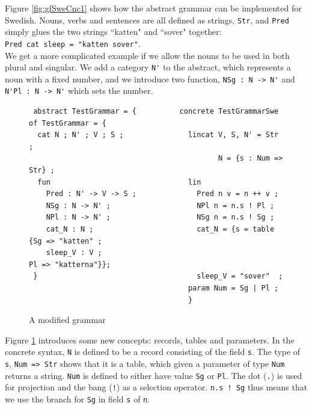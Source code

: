\documentclass{report}
\begin{document}
Figure \ref{fig:gfSweCnc1} shows how the abstract grammar can be implemented
for Swedish. Nouns, verbs and sentences are all defined as strings, \verb|Str|,
and \verb|Pred| simply glues the two strings ``katten" and ``sover" together:\\
\verb|Pred cat sleep = "katten sover"|.\\
We get a more complicated example if we allow the nouns to be used in both
plural and singular. We add a category \verb|N'| to the
abstract, which represents a noun with a fixed number,
and we introduce two function, \verb|NSg : N -> N'| and
\verb|N'Pl : N -> N'| which sets the number.
\begin{figure}[h!]
\begin{verbatim}              
 abstract TestGrammar = {          concrete TestGrammarSwe of TestGrammar = {
  cat N ; N' ; V ; S ;               lincat V, S, N' = Str ;
                                            N = {s : Num => Str} ;
  fun                                lin   
    Pred : N' -> V -> S ;              Pred n v = n ++ v ;
    NSg : N -> N' ;                    NPl n = n.s ! Pl ;
    NPl : N -> N' ;                    NSg n = n.s ! Sg ;
    cat_N : N ;                        cat_N = {s = table {Sg => "katten" ;
    sleep_V : V ;                                          Pl => "katterna"}};
 }                                     sleep_V = "sover"  ;
                                     param Num = Sg | Pl ;
                                     }
\end{verbatim}           
\caption{A modified grammar}
\label{fig:gfTest2}
\end{figure}
Figure \ref{fig:gfTest2} introduces some new concepts: records, tables and parameters.
In the concrete syntax, \verb|N| is defined to be a record consisting of the field
\verb|s|. The type of \verb|s|, \verb-Num => Str- shows that it is a table, which given a
parameter of type \verb|Num| returns a string. \verb|Num| is defined 
to either have value \verb|Sg| or \verb|Pl|. 
The dot (\verb-.-) is used for projection and the bang (\verb-!-) as a selection operator.
\verb|n.s ! Sg| thus means that we use the branch for \verb-Sg- in
field \verb|s| of \verb|n|.
\end{document}
